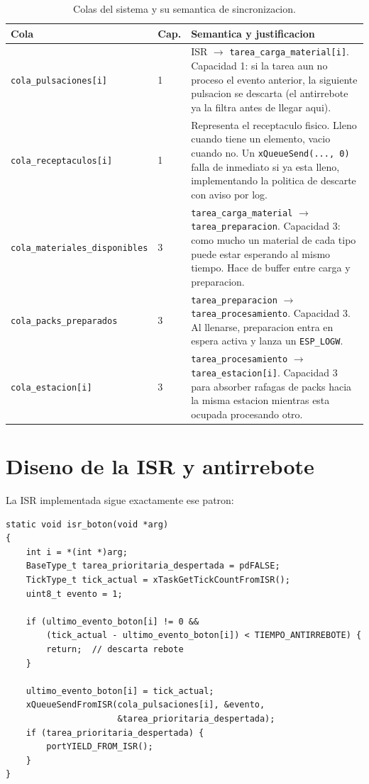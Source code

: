 \documentclass[12pt,a4paper]{article}
\begin{document}
\begin{table}[h!]
\caption{Colas del sistema y su semantica de sincronizacion.}\label{tab:colas}
\begin{tabularx}{\linewidth}{%
  >{\raggedright\arraybackslash\footnotesize}p{5.2cm}%
  >{\centering\arraybackslash\footnotesize}p{0.9cm}%
  >{\raggedright\arraybackslash\footnotesize}X}
\toprule
Cola & Cap. & Semantica y justificacion \\
\midrule
\texttt{cola\_pulsaciones[i]} & 1 & ISR $\to$ \texttt{tarea\_carga\_material[i]}. Capacidad 1: si la tarea aun no proceso el evento anterior, la siguiente pulsacion se descarta (el antirrebote ya la filtra antes de llegar aqui). \\[4pt]
\texttt{cola\_receptaculos[i]} & 1 & Representa el receptaculo fisico. Lleno cuando tiene un elemento, vacio cuando no. Un \texttt{xQueueSend(..., 0)} falla de inmediato si ya esta lleno, implementando la politica de descarte con aviso por log. \\[4pt]
\texttt{cola\_materiales\_disponibles} & 3 & \texttt{tarea\_carga\_material} $\to$ \texttt{tarea\_preparacion}. Capacidad 3: como mucho un material de cada tipo puede estar esperando al mismo tiempo. Hace de buffer entre carga y preparacion. \\[4pt]
\texttt{cola\_packs\_preparados} & 3 & \texttt{tarea\_preparacion} $\to$ \texttt{tarea\_procesamiento}. Capacidad 3. Al llenarse, preparacion entra en espera activa y lanza un \texttt{ESP\_LOGW}. \\[4pt]
\texttt{cola\_estacion[i]} & 3 & \texttt{tarea\_procesamiento} $\to$ \texttt{tarea\_estacion[i]}. Capacidad 3 para absorber rafagas de packs hacia la misma estacion mientras esta ocupada procesando otro. \\
\bottomrule
\end{tabularx}
\end{table}

\section{Diseno de la ISR y antirrebote}
La ISR implementada sigue exactamente ese patron:

\begin{lstlisting}
static void isr_boton(void *arg)
{
    int i = *(int *)arg;
    BaseType_t tarea_prioritaria_despertada = pdFALSE;
    TickType_t tick_actual = xTaskGetTickCountFromISR();
    uint8_t evento = 1;

    if (ultimo_evento_boton[i] != 0 &&
        (tick_actual - ultimo_evento_boton[i]) < TIEMPO_ANTIRREBOTE) {
        return;  // descarta rebote
    }

    ultimo_evento_boton[i] = tick_actual;
    xQueueSendFromISR(cola_pulsaciones[i], &evento,
                      &tarea_prioritaria_despertada);
    if (tarea_prioritaria_despertada) {
        portYIELD_FROM_ISR();
    }
}
\end{lstlisting}
\end{document}

